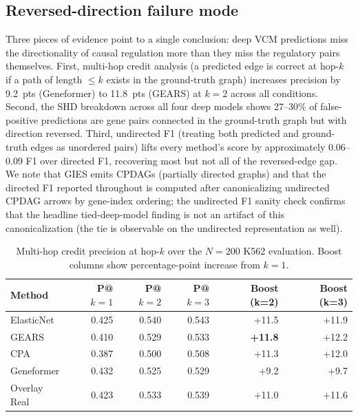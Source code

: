 \documentclass{article}
\theoremstyle{plain}
\theoremstyle{definition}
\theoremstyle{remark}
\begin{document}
\subsection{Reversed-direction failure mode}
\label{sec:reversed-edge}
Three pieces of evidence point to a single conclusion: deep VCM predictions miss the directionality of causal regulation more than they miss the regulatory pairs themselves. First, multi-hop credit analysis (a predicted edge is correct at hop-$k$ if a path of length $\leq k$ exists in the ground-truth graph) increases precision by 9.2~pts (Geneformer) to 11.8~pts (GEARS) at $k{=}2$ across all conditions. Second, the SHD breakdown across all four deep models shows 27--30\% of false-positive predictions are gene pairs connected in the ground-truth graph but with direction reversed. Third, undirected F1 (treating both predicted and ground-truth edges as unordered pairs) lifts every method's score by approximately 0.06--0.09 F1 over directed F1, recovering most but not all of the reversed-edge gap. We note that GIES emits CPDAGs (partially directed graphs) and that the directed F1 reported throughout is computed after canonicalizing undirected CPDAG arrows by gene-index ordering; the undirected F1 sanity check confirms that the headline tied-deep-model finding is not an artifact of this canonicalization (the tie is observable on the undirected representation as well).

\begin{table}[h]
\centering
\small
\begin{tabular}{lrrrrr}
\toprule
\textbf{Method} & \textbf{P@$k{=}1$} & \textbf{P@$k{=}2$} & \textbf{P@$k{=}3$} & \textbf{Boost (k=2)} & \textbf{Boost (k=3)} \\
\midrule
ElasticNet  & 0.425 & 0.540 & 0.543 & +11.5 & +11.9 \\
GEARS       & 0.410 & 0.529 & 0.533 & \textbf{+11.8} & +12.2 \\
CPA         & 0.387 & 0.500 & 0.508 & +11.3 & +12.0 \\
Geneformer  & 0.432 & 0.525 & 0.529 & +9.2  & +9.7  \\
Overlay Real & 0.423 & 0.533 & 0.539 & +11.0 & +11.6 \\
\bottomrule
\end{tabular}
\caption{Multi-hop credit precision at hop-$k$ over the $N{=}200$ K562 evaluation. Boost columns show percentage-point increase from $k{=}1$.}
\end{table}
\end{document}
